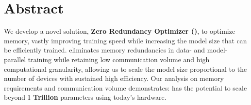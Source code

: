 \section*{Abstract}
We develop a novel solution, \textbf{Zero Redundancy Optimizer (\name)}, to optimize memory, vastly improving training speed while increasing the model size that can be efficiently trained.
\name eliminates memory redundancies in data- and model-parallel training while retaining low communication volume and high computational granularity, allowing us to scale the model size proportional to the number of devices with sustained high efficiency. Our analysis on memory requirements and communication volume demonstrates: \name has the potential to scale beyond 1 \textbf{Trillion} parameters using today's hardware.
